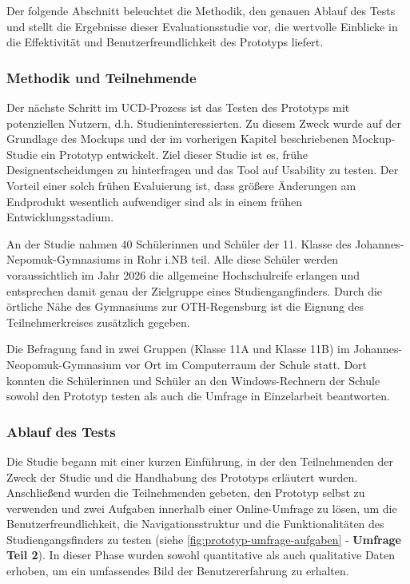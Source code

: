 Der folgende Abschnitt beleuchtet die Methodik, den genauen Ablauf des Tests und stellt die Ergebnisse dieser Evaluationsstudie vor, die wertvolle Einblicke in die Effektivität und Benutzerfreundlichkeit des Prototyps liefert.

\subsubsection{Methodik und Teilnehmende}
Der nächste Schritt im UCD-Prozess ist das Testen des Prototyps mit potenziellen Nutzern, d.h. Studieninteressierten. Zu diesem Zweck wurde auf der Grundlage des Mockups und der im vorherigen Kapitel beschriebenen Mockup-Studie ein Prototyp entwickelt. Ziel dieser Studie ist es, frühe Designentscheidungen zu hinterfragen und das Tool auf Usability zu testen. Der Vorteil einer solch frühen Evaluierung ist, dass größere Änderungen am Endprodukt wesentlich aufwendiger sind als in einem frühen Entwicklungsstadium.

An der Studie nahmen 40 Schülerinnen und Schüler der 11. Klasse des Johannes-Nepomuk-Gymnasiums in Rohr i.NB teil. Alle diese Schüler werden voraussichtlich im Jahr 2026 die allgemeine Hochschulreife erlangen und entsprechen damit genau der Zielgruppe eines Studiengangfinders. Durch die örtliche Nähe des Gymnasiums zur OTH-Regensburg ist die Eignung des Teilnehmerkreises zusätzlich gegeben.

Die Befragung fand in zwei Gruppen (Klasse 11A und Klasse 11B) im Johannes-Neopomuk-Gymnasium vor Ort im Computerraum der Schule statt. Dort konnten die Schülerinnen und Schüler an den Windows-Rechnern der Schule sowohl den Prototyp testen als auch die Umfrage in Einzelarbeit beantworten.

\subsubsection{Ablauf des Tests}
Die Studie begann mit einer kurzen Einführung, in der den Teilnehmenden der
Zweck der Studie und die Handhabung des Prototyps erläutert wurden. Anschließend
wurden die Teilnehmenden gebeten, den Prototyp selbst zu verwenden und zwei
Aufgaben innerhalb einer Online-Umfrage zu lösen, um die Benutzerfreundlichkeit, die Navigationsstruktur und
die Funktionalitäten des Studiengangsfinders zu testen (siehe
\autoref{fig:prototyp-umfrage-aufgaben} - \textbf{Umfrage Teil 2}). In dieser Phase wurden sowohl
quantitative als auch qualitative Daten erhoben, um ein umfassendes Bild der 
Benutzererfahrung zu erhalten.

